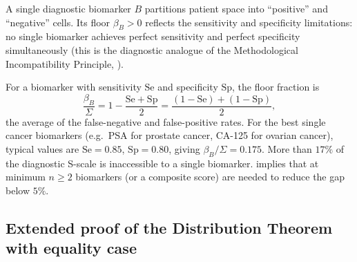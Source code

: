 \begin{example}
\label{ex:ch02-single-biomarker}
A single diagnostic biomarker $B$ partitions patient space into ``positive''
and ``negative'' cells.  Its floor $\beta_B > 0$ reflects the sensitivity and
specificity limitations: no single biomarker achieves perfect sensitivity and
perfect specificity simultaneously (this is the diagnostic analogue of the
Methodological Incompatibility Principle, ).

For a biomarker with sensitivity $\mathrm{Se}$ and specificity $\mathrm{Sp}$,
the floor fraction is
\[
  \frac{\beta_B}{\Sigma}
  = 1 - \frac{\mathrm{Se} + \mathrm{Sp}}{2}
  = \frac{(1 - \mathrm{Se}) + (1 - \mathrm{Sp})}{2},
\]
the average of the false-negative and false-positive rates.  For the best
single cancer biomarkers (e.g.\ PSA for prostate cancer, CA-125 for ovarian
cancer), typical values are $\mathrm{Se} = 0.85$, $\mathrm{Sp} = 0.80$, giving
$\beta_B/\Sigma = 0.175$.  More than $17\%$ of the diagnostic S-scale is
inaccessible to a single biomarker.   implies that
at minimum $n \geq 2$ biomarkers (or a composite score) are needed to reduce
the gap below $5\%$.
\end{example}

\subsection{Extended proof of the Distribution Theorem with equality case}

